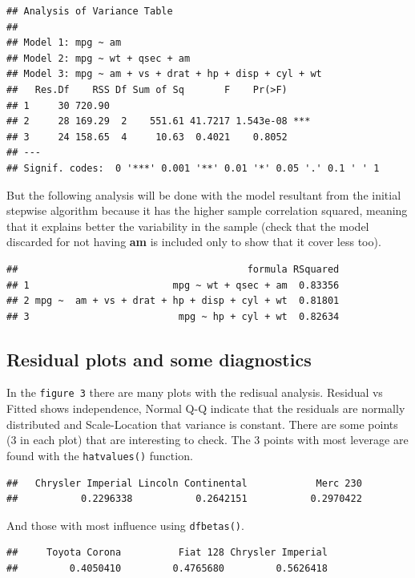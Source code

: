 \documentclass[]{article}
\begin{document}
\begin{verbatim}
## Analysis of Variance Table
## 
## Model 1: mpg ~ am
## Model 2: mpg ~ wt + qsec + am
## Model 3: mpg ~ am + vs + drat + hp + disp + cyl + wt
##   Res.Df    RSS Df Sum of Sq       F    Pr(>F)    
## 1     30 720.90                                   
## 2     28 169.29  2    551.61 41.7217 1.543e-08 ***
## 3     24 158.65  4     10.63  0.4021    0.8052    
## ---
## Signif. codes:  0 '***' 0.001 '**' 0.01 '*' 0.05 '.' 0.1 ' ' 1
\end{verbatim}

But the following analysis will be done with the model resultant from
the initial stepwise algorithm because it has the higher sample
correlation squared, meaning that it explains better the variability in
the sample (check that the model discarded for not having \textbf{am} is
included only to show that it cover less too).

\begin{verbatim}
##                                        formula RSquared
## 1                         mpg ~ wt + qsec + am  0.83356
## 2 mpg ~  am + vs + drat + hp + disp + cyl + wt  0.81801
## 3                          mpg ~ hp + cyl + wt  0.82634
\end{verbatim}

\subsection{Residual plots and some
diagnostics}\label{residual-plots-and-some-diagnostics}

In the \texttt{figure 3} there are many plots with the redisual
analysis. Residual vs Fitted shows independence, Normal Q-Q indicate
that the residuals are normally distributed and Scale-Location that
variance is constant. There are some points (3 in each plot) that are
interesting to check. The 3 points with most leverage are found with the
\texttt{hatvalues()} function.

\begin{verbatim}
##   Chrysler Imperial Lincoln Continental            Merc 230 
##           0.2296338           0.2642151           0.2970422
\end{verbatim}

And those with most influence using \texttt{dfbetas()}.

\begin{verbatim}
##     Toyota Corona          Fiat 128 Chrysler Imperial 
##         0.4050410         0.4765680         0.5626418
\end{verbatim}
\end{document}
